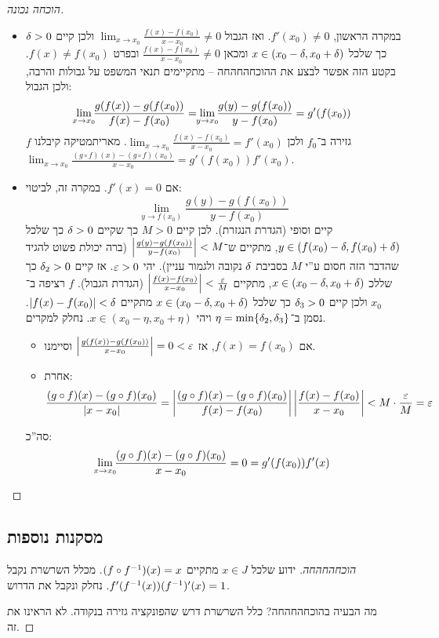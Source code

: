 \documentclass[name=רשימות חשבון דיפרנציאלי ואינטגרלי 1א]{../../../tex/classes/megasumPreamble}
\newcommand\tfl     {\lim_{\mathclap{x \to x_0}}}
\begin{document}
	\begin{proof}[הוכחה נכונה]
		\begin{itemize}
			\item במקרה הראשון, $f'(x_0) \neq 0$. ואז הגבול $\lim_{x \to x_0} \frac{f(x) - f(x_0)}{x - x_0} \neq 0$ ולכן קיים $\delta > 0$ כך שלכל $x \in (x_0 - \delta, x_0 + \delta)$ ומכאן $\frac{f(x) -f(x_0)}{x - x_0} \neq 0$  ובפרט $f(x) \neq f(x_0)$. בקטע הזה אפשר לבצע את ההוכחהחהחה – מתקיימים תנאי המשפט על גבולות והרבה, ולכן הגבול:
			\[ \tfl \frac{g(f(x)) - g(f(x_0))}{f(x) - f(x_0)} = \lim_{\mathclap{y \to x_0}} \frac{g(y) - g(f(x_0))}{y - f(x_0)} = g'(f(x_0)) \]
			$f$ גזירה ב־$f_0$ ולכן $\lim_{x \to x_0} \frac{f(x) - f(x_0)}{x - x_0} = f'(x_0)$. מאריתמטיקה קיבלנו $\lim_{x \to x_0} \frac{(g \circ f)(x) - (g \circ f)(x_0)}{x - x_0} = g'(f(x_0))f'(x_0)$.
			\item אם $f'(x) = 0$. במקרה זה, לביטוי:
			\[ \lim_{y \to f(x_0)} \frac{g(y) -g(f(x_0))}{y - f(x_0)} \]
			קיים וסופי (הגדרת הנגזרת). לכן קיים $M > 0$ כך שקיים $\delta > 0$ כך שלכל $y \in (f(x_0) - \delta, f(x_0) + \delta)$, מתקיים ש־$\left \lvert \frac{g(y) - g(f(x_0))}{y - f(x_0)} \right \rvert < M$ (ברה יכולת פשוט להגיד שהדבר הזה חסום ע''י $M$ בסביבת $\delta$ נקובה ולגמור עניין). יהי $\eg > 0$. אז קיים $\delta_2 > 0$ כך שללכ $x \in (x_0 - \delta, x_0 + \delta)$, מתקיים $\sof{\frac{f(x) - f(x_0)}{x - x_0}} < \frac{\eg}{M}$ (הגדרת הגבול). $f$ רציפה ב־$x_0$ ולכן קיים $\delta_3 > 0$ כך שלכל $x \in (x_0 - \delta, x_0 + \delta)$ מתקיים $\left \lvert f(x) - f(x_0) \right \rvert < \delta$. נסמן ב־$\eta = \min\{\delta_2, \delta_3\}$ ויהי $x \in (x_0 - \eta, x_0 + \eta)$. נחלק למקרים.
			\begin{itemize}
				\item אם $f(x) = f(x_0)$, אז $\sof{\frac{g(f(x)) - g(f(x_0))}{x - x_0}} = 0 < \eg$ וסיימנו.
				\item אחרת:
				\[ \frac{(g \circ f)(x) - (g \circ f)(x_0)}{\sof{x - x_0}} = \sof{\frac{(g \circ f)(x) - (g \circ f)(x_0)}{f(x) - f(x_0)}}\sof{\frac{f(x) - f(x_0)}{x - x_0}} < M \cdot \frac{\eg}{M} = \eg \]
			\end{itemize}
			סה''כ:
			\[ \tfl \frac{(g \circ f)(x) - (g \circ f)(x_0)}{x - x_0} = 0 = g'(f(x_0))f'(x) \]\envendproof
		\end{itemize}
	\end{proof}

	\subsection{מסקנות נוספות}
	\begin{proof}[הוכחהחהחה]
		ידוע שלכל $x \in J$ מתקיים $(f \circ f^{-1})(x) = x$. מכלל השרשרת נקבל $f'(f^{-1}(x))(f^{-1})'(x) = 1$. נחלק ונקבל את הדרוש.

		מה הבעיה בהוכחהחהחה? כלל השרשרת דרש שהפונקציה גזירה בנקודה. לא הראינו את זה.
	\end{proof}
\end{document}
